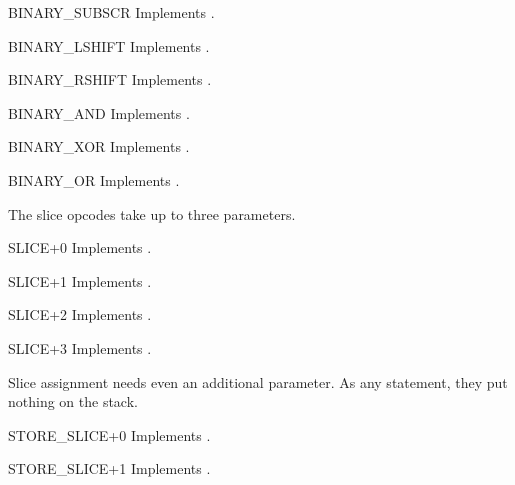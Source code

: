 \begin{funcdesc}{BINARY_SUBSCR}{}
Implements .
\end{funcdesc}

\begin{funcdesc}{BINARY_LSHIFT}{}
Implements .
\end{funcdesc}

\begin{funcdesc}{BINARY_RSHIFT}{}
Implements .
\end{funcdesc}

\begin{funcdesc}{BINARY_AND}{}
Implements .
\end{funcdesc}

\begin{funcdesc}{BINARY_XOR}{}
Implements .
\end{funcdesc}

\begin{funcdesc}{BINARY_OR}{}
Implements .
\end{funcdesc}

The slice opcodes take up to three parameters.

\begin{funcdesc}{SLICE+0}{}
Implements .
\end{funcdesc}

\begin{funcdesc}{SLICE+1}{}
Implements .
\end{funcdesc}

\begin{funcdesc}{SLICE+2}{}
Implements .
\end{funcdesc}

\begin{funcdesc}{SLICE+3}{}
Implements .
\end{funcdesc}

Slice assignment needs even an additional parameter.  As any statement,
they put nothing on the stack.

\begin{funcdesc}{STORE_SLICE+0}{}
Implements .
\end{funcdesc}

\begin{funcdesc}{STORE_SLICE+1}{}
Implements .
\end{funcdesc}

